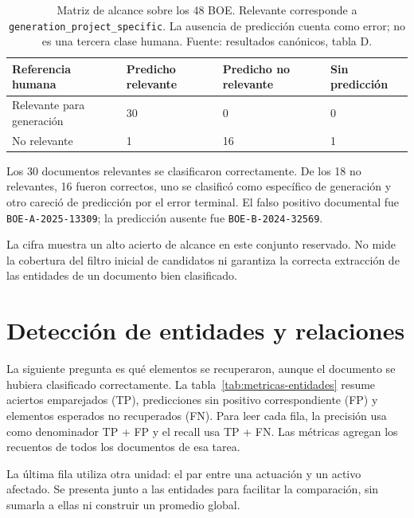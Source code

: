 \begin{table}[htbp]
\centering
\small
\renewcommand{\arraystretch}{1.2}
\begin{tabular}{L{4.6cm} C{2.2cm} C{2.2cm} C{2.2cm}}
\hline
Referencia humana & Predicho relevante & Predicho no relevante & Sin predicción \\
\hline
Relevante para generación & 30 & 0 & 0 \\
No relevante & 1 & 16 & 1 \\
\hline
\end{tabular}
\caption[Clasificación del alcance documental]{Matriz de alcance sobre los
48 BOE. Relevante corresponde a \texttt{generation\_project\_specific}.
La ausencia de predicción cuenta como error; no es una tercera clase humana.
Fuente: resultados canónicos, tabla D.}
\label{tab:scope-resultados}
\end{table}

Los 30 documentos relevantes se clasificaron correctamente. De los
18 no relevantes, 16 fueron correctos, uno se clasificó como específico
de generación y otro careció de predicción por el error terminal.
El falso positivo documental fue \texttt{BOE-A-2025-13309}; la predicción
ausente fue \texttt{BOE-B-2024-32569}.

La cifra muestra un alto acierto de alcance en este conjunto reservado.
No mide la cobertura del filtro inicial de candidatos ni garantiza la
correcta extracción de las entidades de un documento bien clasificado.

\section{Detección de entidades y relaciones}
La siguiente pregunta es qué elementos se recuperaron, aunque el documento
se hubiera clasificado correctamente. La tabla~\ref{tab:metricas-entidades}
resume aciertos emparejados (TP), predicciones sin positivo correspondiente
(FP) y elementos esperados no recuperados (FN). Para leer cada fila, la
precisión usa como denominador TP + FP y el recall usa TP + FN.
Las métricas agregan los recuentos de todos los documentos de esa tarea.

La última fila utiliza otra unidad: el par entre una actuación y un activo
afectado. Se presenta junto a las entidades para facilitar la comparación,
sin sumarla a ellas ni construir un promedio global.

